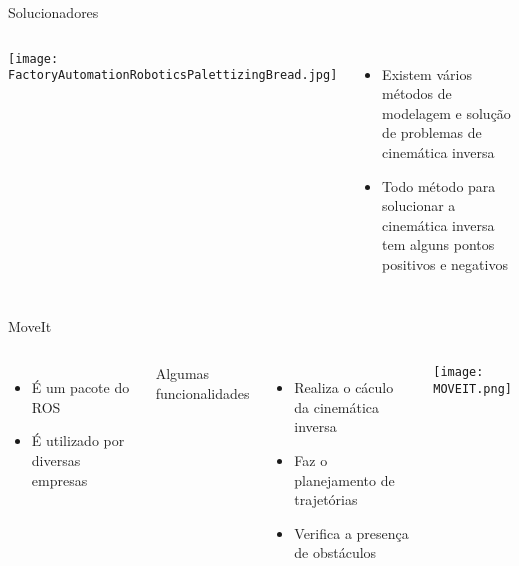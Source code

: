 \begin{frame}[c]{Solucionadores}
    \begin{columns}
        \texttt{[image: FactoryAutomationRoboticsPalettizingBread.jpg]}
        \begin{itemize}
            \item Existem vários métodos de modelagem e solução de problemas de cinemática inversa 
            \singlespacing
            \item Todo método para solucionar a cinemática inversa tem alguns pontos positivos e negativos
        \end{itemize}
    \end{columns}
\end{frame}
\begin{frame}[c]{MoveIt}
    \begin{columns}
        \begin{itemize}
            \item É um pacote do ROS
            \item É utilizado por diversas empresas
        \end{itemize}
        \singlespacing
        Algumas funcionalidades
        \begin{itemize}
            \item Realiza o cáculo da cinemática inversa
            \item Faz o planejamento de trajetórias
            \item Verifica a presença de obstáculos
        \end{itemize}
            \centering
            \texttt{[image: MOVEIT.png]}
    \end{columns}
\end{frame}
